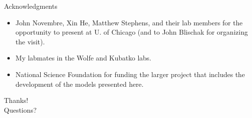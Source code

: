 \documentclass[presentation,sansserif]{beamer}
\begin{document}
\begin{frame}[t,plain]{Acknowledgments}
  \vspace{0.2in}

  \begin{itemize}
    \setlength\itemsep{0.3in}
    \item John Novembre, Xin He, Matthew Stephens, and their lab members for the opportunity to present at U. of Chicago (and to John Blischak for organizing the visit).
    \item My labmates in the Wolfe and Kubatko labs.
    \item National Science Foundation for funding the larger project that includes the development of the models presented here.
  \end{itemize}

\end{frame}

\begin{frame}[c,plain]{}
	\begin{center}
		{\Huge Thanks!}\\
		\vspace{0.5in}
		{\LARGE Questions?}
	\end{center}
\end{frame}
\end{document}
